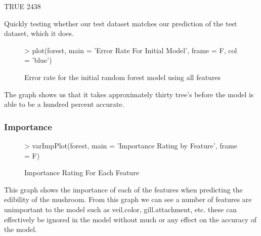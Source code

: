 \documentclass[10pt]{article}         %
\begin{document}
\begin{Schunk}
\begin{Soutput}
TRUE 
2438 
\end{Soutput}
\end{Schunk}
\pagebreak
Quickly testing whether our test dataset matches our prediction of the test dataset, which it does.
\begin{figure}[H]
\begin{center}
\begin{Schunk}
\begin{Sinput}
> plot(forest, main = 'Error Rate For Initial Model', frame = F, col = 'blue')
\end{Sinput}
\end{Schunk}
\caption {Error rate for the initial random forest model using all features}
\label{fig4}
\end {center}
\end {figure}
The graph shows us that it takes approximately thirty tree's before the model is able to be a hundred percent accurate.

\pagebreak\subsubsection{Importance}
\begin{figure}[H]
\begin{center}
\begin{Schunk}
\begin{Sinput}
> varImpPlot(forest, main = 'Importance Rating by Feature', frame = F)
\end{Sinput}
\end{Schunk}
\caption {Importance Rating For Each Feature}
\label{fig5}
\end {center}
\end {figure}
This graph shows the importance of each of the features when predicting the edibility of the mushroom. From this graph we can see a number of features are unimportant to the model such as veil.color, gill.attachment, etc. these can effectively be ignored in the model without much or any effect on the accuracy of the model.
\end{document}

